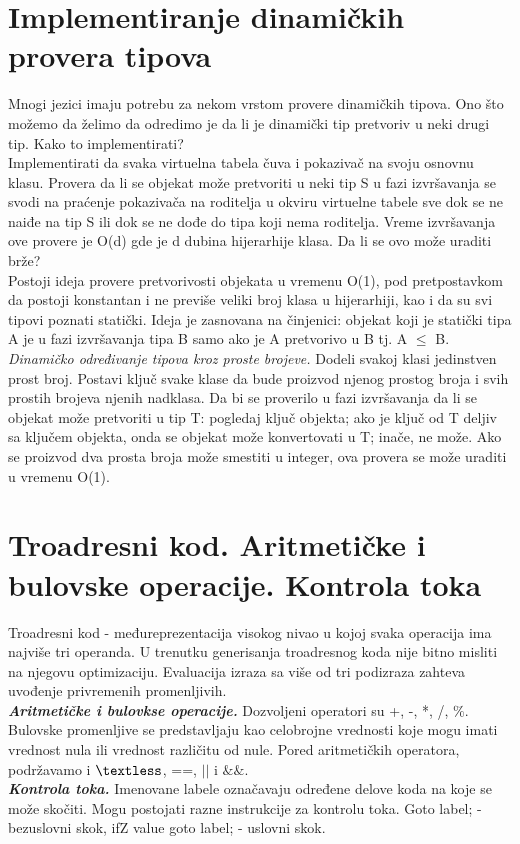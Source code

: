 \documentclass[10pt]{extarticle}
\begin{document}
\section{Implementiranje dinamičkih provera tipova}
\noindent
Mnogi jezici imaju potrebu za nekom vrstom provere dinamičkih tipova. Ono što možemo da želimo da odredimo je da li je dinamički tip pretvoriv u neki drugi tip. Kako to implementirati? \\
Implementirati da svaka virtuelna tabela čuva i pokazivač na svoju osnovnu klasu. Provera da li se objekat može pretvoriti u neki tip S u fazi izvršavanja se svodi na praćenje pokazivača na roditelja u okviru virtuelne tabele sve dok se ne naiđe na tip S ili dok se ne dođe do tipa koji nema roditelja. Vreme izvršavanja ove provere je O(d) gde je d dubina hijerarhije klasa. Da li se ovo može uraditi brže? \\
Postoji ideja provere pretvorivosti objekata u vremenu O(1), pod pretpostavkom da postoji konstantan i ne previše veliki broj klasa u hijerarhiji, kao i da su svi tipovi poznati statički. Ideja je zasnovana na činjenici: objekat koji je statički tipa A je u fazi izvršavanja tipa B samo ako je A pretvorivo u B tj. A $\leq$ B.\\
\textit{Dinamičko određivanje tipova kroz proste brojeve.} Dodeli svakoj klasi jedinstven prost broj. Postavi ključ svake klase da bude proizvod njenog prostog broja i svih prostih brojeva njenih nadklasa. Da bi se proverilo u fazi izvršavanja da li se objekat može pretvoriti u tip T: pogledaj ključ objekta; ako je ključ od T deljiv sa ključem objekta, onda se objekat može konvertovati u T; inače, ne može. Ako se proizvod dva prosta broja može smestiti u integer, ova provera se može uraditi u vremenu O(1).

\section{Troadresni kod. Aritmetičke i bulovske operacije. Kontrola toka}
\noindent
Troadresni kod - međureprezentacija visokog nivao u kojoj svaka operacija ima najviše tri operanda. U trenutku generisanja troadresnog koda nije bitno misliti na njegovu optimizaciju. Evaluacija izraza sa više od tri podizraza zahteva uvođenje privremenih promenljivih.\\
\textit{\textbf{Aritmetičke i bulovkse operacije.}} Dozvoljeni operatori su +, -, *, /, $\%$. Bulovske promenljive se predstavljaju kao celobrojne vrednosti koje mogu imati vrednost nula ili vrednost različitu od nule. Pored aritmetičkih operatora, podržavamo i $\textless$, ==, $||$ i $\&\&$.\\
\textit{\textbf{Kontrola toka.}} Imenovane labele označavaju određene delove koda na koje se može skočiti. Mogu postojati razne instrukcije za kontrolu toka. Goto label; - bezuslovni skok, ifZ value goto label; - uslovni skok.
\end{document}
